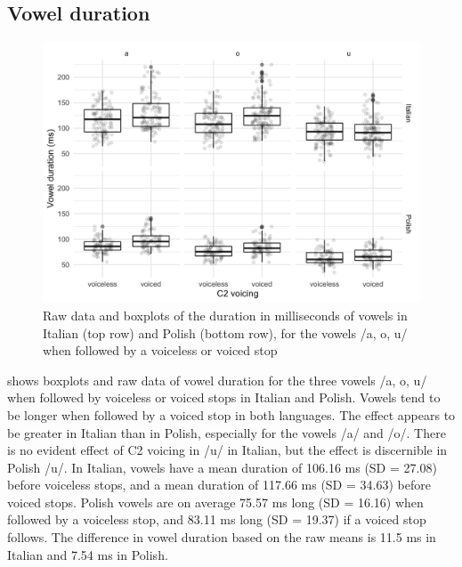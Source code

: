 \documentclass[charis]{glossa}
\begin{document}
\hypertarget{vowel-duration}{%
\subsection{Vowel duration}\label{vowel-duration}}

\label{s:vduration}

\begin{figure}
\includegraphics[width=\linewidth]{./Figure2-1} \caption{Raw data and boxplots of the duration in milliseconds of vowels in Italian (top row) and Polish (bottom row), for the vowels /a, o, u/ when followed by a voiceless or voiced stop}\label{f:Figure2}
\end{figure}

 shows boxplots and raw data of vowel duration for the
three vowels /a, o, u/ when followed by voiceless or voiced stops in
Italian and Polish. Vowels tend to be longer when followed by a voiced
stop in both languages. The effect appears to be greater in Italian than
in Polish, especially for the vowels /a/ and /o/. There is no evident
effect of C2 voicing in /u/ in Italian, but the effect is discernible in
Polish /u/. In Italian, vowels have a mean duration of 106.16 ms (SD =
27.08) before voiceless stops, and a mean duration of 117.66 ms (SD =
34.63) before voiced stops. Polish vowels are on average 75.57 ms long
(SD = 16.16) when followed by a voiceless stop, and 83.11 ms long (SD =
19.37) if a voiced stop follows. The difference in vowel duration based
on the raw means is 11.5 ms in Italian and 7.54 ms in Polish.
\end{document}
